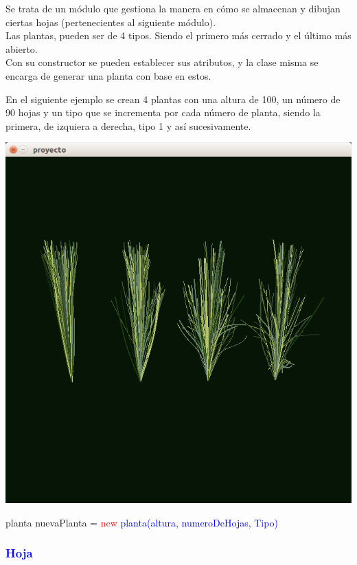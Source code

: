 \documentclass[11pt,a4paper]{article}
\begin{document}
			Se trata de un módulo que gestiona la manera en cómo se almacenan y dibujan ciertas hojas (pertenecientes al siguiente módulo).\\
			Las plantas, pueden ser de 4 tipos. Siendo el primero más cerrado y el último más abierto.\\
			Con su constructor se pueden establecer sus atributos, y la clase misma se encarga de generar una planta con base en estos.

			En el siguiente ejemplo se crean 4 plantas con una altura de 100, un número de 90 hojas y un tipo que se incrementa por cada número de planta, siendo la primera, de izquiera a derecha, tipo 1 y así sucesivamente.

			
			\begin{center}
			\includegraphics[scale =.4]{CAP7}
			\end{center}
			\begin{center}
			planta nuevaPlanta = \textcolor{red}{new} \textcolor{blue}{planta(altura, numeroDeHojas, Tipo)}
			\end{center}
		
		\subsubsection{\textcolor{blue}{Hoja}}
\end{document}
